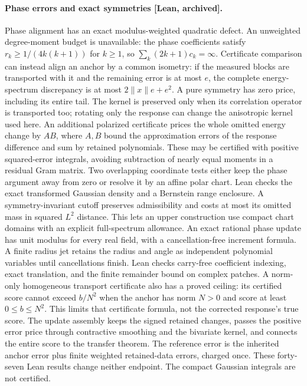 \documentclass[11pt,a4paper]{article}
\begin{document}
\paragraph{Phase errors and exact symmetries [Lean, archived].}
Phase alignment has an exact modulus-weighted quadratic defect. An unweighted
degree-moment budget is unavailable: the phase coefficients satisfy
$r_k\ge1/(4k(k+1))$ for $k\ge1$, so $\sum_k(2k+1)c_k=\infty$.
Certificate comparison can instead align an anchor by a common isometry:
if the measured blocks are transported with it and the remaining error is at
most $e$, the complete energy-spectrum discrepancy is at most
$2\|x\|e+e^2$. A pure symmetry has zero price, including its entire tail.
The kernel is preserved only when its correlation operator is transported
too; rotating only the response can change the anisotropic kernel used here.
An additional polarized certificate prices the whole omitted energy change
by $AB$, where $A,B$ bound the approximation errors of the response difference
and sum by retained polynomials. These may be certified with positive
squared-error integrals, avoiding subtraction of nearly equal moments in a
residual Gram matrix. Two overlapping coordinate tests either keep the phase
argument away from zero or resolve it by an affine polar chart. Lean checks
the exact transformed Gaussian density and a Bernstein range enclosure.
A symmetry-invariant cutoff preserves admissibility and costs at most its
omitted mass in squared $L^2$ distance. This lets an upper construction use
compact chart domains with an explicit full-spectrum allowance.
An exact rational phase update has unit modulus for every real field, with
a cancellation-free increment formula. A finite radius jet retains the radius
and angle as independent polynomial variables until cancellations finish.
Lean checks carry-free coefficient indexing, exact translation, and the
finite remainder bound on complex patches. A norm-only homogeneous transport
certificate also has a proved ceiling: its certified score cannot exceed
$b/N^2$ when the anchor has norm $N>0$ and score at least $0\le b\le N^2$.
This limits that certificate formula, not the corrected response's true score.
The update assembly keeps the signed retained changes, passes the positive
error price through contractive smoothing and the bivariate kernel, and
connects the entire score to the transfer theorem. The reference error is
the inherited anchor error plus finite weighted retained-data errors,
charged once. These forty-seven Lean results change neither endpoint.
The compact Gaussian integrals are not certified.
\end{document}

